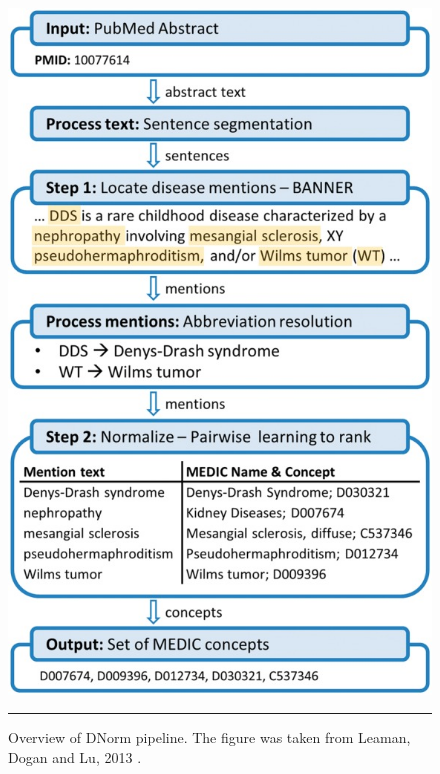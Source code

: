 \begin{figure}[htbp]
  \centering
    \includegraphics{Figures/dnorm.jpg}
    \rule{35em}{0.5pt}
  \caption[Overview of DNorm pipeline]{Overview of DNorm pipeline. The figure was taken from Leaman, Dogan and Lu, 2013 \citep{leaman2013dnorm}.}
  \label{fig:DNorm}
\end{figure}

